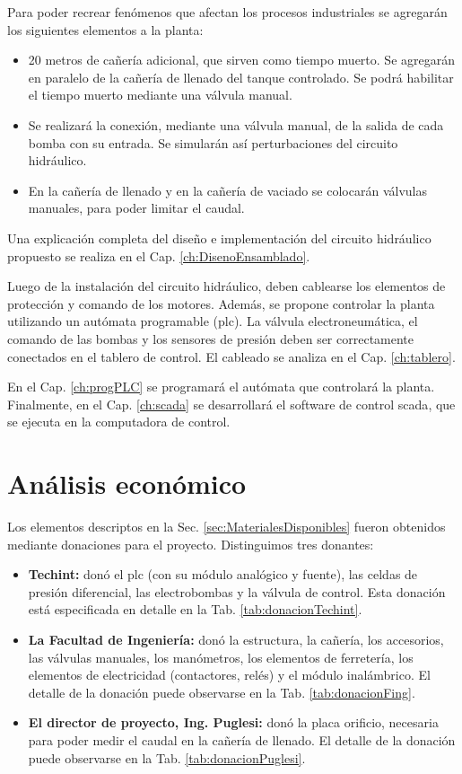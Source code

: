 Para poder recrear fenómenos que afectan los procesos industriales se agregarán
los siguientes elementos a la planta:
\begin{itemize}
\item 20 metros de cañería adicional, que sirven como tiempo
muerto.
Se agregarán en paralelo de la cañería de llenado del tanque controlado.
Se podrá habilitar el tiempo muerto mediante una válvula manual.
\item Se realizará la conexión, mediante una válvula manual, de la salida de
cada bomba con su entrada. Se simularán así perturbaciones
del circuito hidráulico.
\item En la cañería de llenado y en la cañería de vaciado se colocarán válvulas
manuales, para poder limitar el caudal.
\end{itemize}

Una explicación completa del diseño e implementación del circuito hidráulico
propuesto se realiza en el Cap. \ref{ch:DisenoEnsamblado}.

Luego de la instalación del circuito hidráulico, deben cablearse los elementos
de protección y comando de los motores.
Además, se propone controlar la planta utilizando un autómata
programable (\gls{plc}).
La válvula electroneumática, el comando de las bombas y los sensores de presión
deben ser correctamente conectados en el tablero de control.
El cableado se analiza en el Cap. \ref{ch:tablero}.

En el Cap. \ref{ch:progPLC} se programará el autómata que controlará la
planta. Finalmente, en el Cap. \ref{ch:scada} se desarrollará el software
de control \gls{scada}, que se ejecuta en la computadora de control.

\section{Análisis económico}
\label{sec:AnalisisEconomico}
Los elementos descriptos en la Sec. \ref{sec:MaterialesDisponibles} fueron
obtenidos mediante donaciones para el proyecto.
Distinguimos tres donantes:
\begin{itemize}
 \item \textbf{Techint:} donó el \gls{plc} (con su módulo analógico y fuente),
las celdas de presión diferencial, las electrobombas y la válvula de control.
Esta donación está especificada en detalle en la Tab.
\ref{tab:donacionTechint}.
 \item \textbf{La Facultad de Ingeniería:} donó la estructura, la cañería, los
accesorios, las válvulas manuales, los manómetros, los elementos de ferretería,
los elementos de electricidad (contactores, relés) y el módulo inalámbrico.
El detalle de la donación puede observarse en la Tab. \ref{tab:donacionFing}.
\item \textbf{El director de proyecto, Ing. Puglesi:} donó la placa orificio,
necesaria para poder medir el caudal en la cañería de llenado.
El detalle de la donación puede observarse en la Tab.
\ref{tab:donacionPuglesi}.
\end{itemize}

